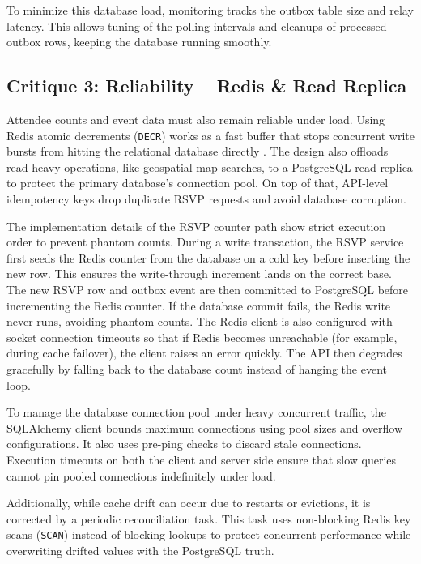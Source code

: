 To minimize this database load, monitoring tracks the outbox table size and relay latency. This allows tuning of the polling intervals and cleanups of processed outbox rows, keeping the database running smoothly.

\subsection{Critique 3: Reliability -- Redis \& Read Replica}
Attendee counts and event data must also remain reliable under load. Using Redis atomic decrements (\texttt{DECR}) works as a fast buffer that stops concurrent write bursts from hitting the relational database directly \cite{redis_race_condition}. The design also offloads read-heavy operations, like geospatial map searches, to a PostgreSQL read replica to protect the primary database's connection pool. On top of that, API-level idempotency keys drop duplicate RSVP requests and avoid database corruption.

The implementation details of the RSVP counter path show strict execution order to prevent phantom counts. During a write transaction, the RSVP service first seeds the Redis counter from the database on a cold key before inserting the new row. This ensures the write-through increment lands on the correct base. The new RSVP row and outbox event are then committed to PostgreSQL before incrementing the Redis counter. If the database commit fails, the Redis write never runs, avoiding phantom counts. The Redis client is also configured with socket connection timeouts so that if Redis becomes unreachable (for example, during cache failover), the client raises an error quickly. The API then degrades gracefully by falling back to the database count instead of hanging the event loop.

To manage the database connection pool under heavy concurrent traffic, the SQLAlchemy client bounds maximum connections using pool sizes and overflow configurations. It also uses pre-ping checks to discard stale connections. Execution timeouts on both the client and server side ensure that slow queries cannot pin pooled connections indefinitely under load.

Additionally, while cache drift can occur due to restarts or evictions, it is corrected by a periodic reconciliation task. This task uses non-blocking Redis key scans (\texttt{SCAN}) instead of blocking lookups to protect concurrent performance while overwriting drifted values with the PostgreSQL truth.

